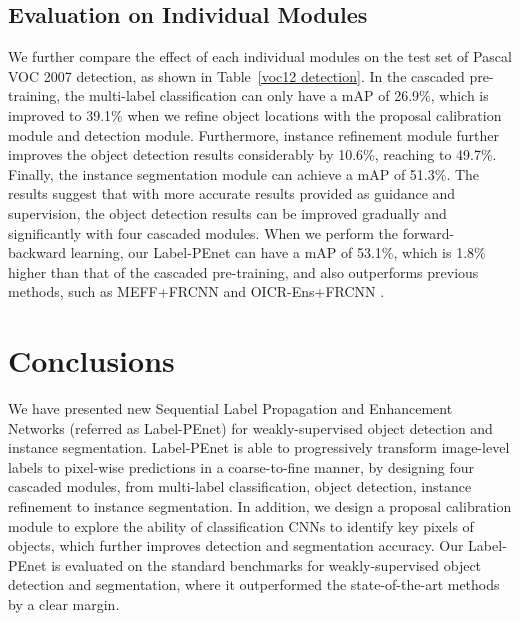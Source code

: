 \documentclass[10pt,twocolumn,letterpaper]{article}
\begin{document}
\subsection{Evaluation on Individual Modules}
We further compare the effect of each individual modules on the test set of Pascal VOC 2007 detection, as shown in Table~\ref{voc12 detection}. In the cascaded pre-training, the multi-label classification can only have a mAP of 26.9\%, which is improved to 39.1\% when we refine object locations with the proposal calibration module and detection module. Furthermore, instance refinement module further improves the object detection results considerably by 10.6\%, reaching to 49.7\%. Finally, the instance segmentation module can achieve a mAP of 51.3\%.
The results suggest that with more accurate results provided as guidance and supervision, the object detection results can be improved gradually and significantly with four cascaded modules. When we perform the forward-backward learning, our Label-PEnet can have a mAP of 53.1\%, which is 1.8\% higher than that of the cascaded pre-training, and also outperforms previous methods, such as MEFF+FRCNN \cite{ge2018multi} and OICR-Ens+FRCNN \cite{tang2017multiple}.

\section{Conclusions}
We have presented new Sequential Label Propagation and Enhancement Networks (referred as
Label-PEnet) for weakly-supervised object detection and instance segmentation. Label-PEnet is able to progressively transform image-level labels to pixel-wise predictions in a coarse-to-fine manner, by designing four cascaded modules, from multi-label classification, object detection, instance refinement to instance segmentation.
In addition, we design a proposal calibration module to explore the ability
of classification CNNs to identify key pixels of objects, which further improves detection and segmentation accuracy. Our Label-PEnet is evaluated on the standard benchmarks for weakly-supervised object detection and segmentation, where it outperformed the state-of-the-art methods by a clear margin.






{\small


}
\end{document}
